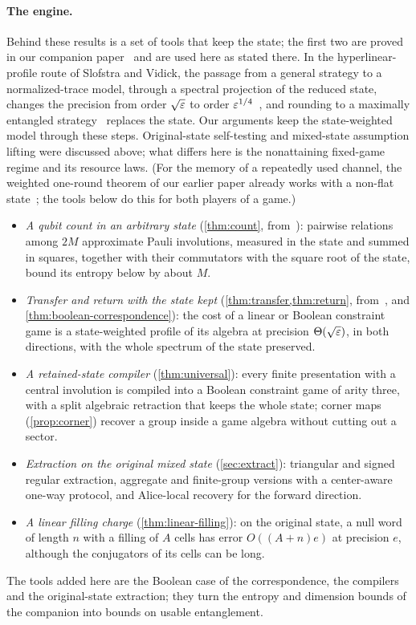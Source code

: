 \paragraph{The engine.} Behind these results is a set of tools that keep the state; the first two are proved in our companion
paper~\cite{DM-game} and are used here as stated there. In the hyperlinear-profile route of
Slofstra and Vidick, the passage from a general strategy to a normalized-trace model, through a spectral projection of the
reduced state, changes the precision from order $\sqrt{\varepsilon}$ to order $\varepsilon^{1/4}$~\cite[Theorem~5.1 and Lemmas~5.5,
5.6]{SV18}, and rounding to a maximally entangled strategy~\cite{Pad22} replaces the state. Our arguments keep the
state-weighted model through these steps. Original-state self-testing and mixed-state assumption lifting were discussed
above; what differs here is the nonattaining fixed-game regime and its resource laws. (For the memory of a repeatedly used
channel, the weighted one-round theorem of our earlier paper already works with a non-flat state~\cite[Theorem~10.1]{DM-lamps};
the tools below do this for both players of a game.)
\begin{itemize}[leftmargin=*,itemsep=2pt]
\item \emph{A qubit count in an arbitrary state} (\cref{thm:count}, from~\cite[Theorem~C]{DM-game}): pairwise relations among $2M$
approximate Pauli involutions, measured in the state and summed in squares, together with their commutators with the square root
of the state, bound its entropy below by about $M$.
\item \emph{Transfer and return with the state kept} (\cref{thm:transfer,thm:return}, from~\cite[Theorem~D]{DM-game}, and
\cref{thm:boolean-correspondence}): the cost of a linear or Boolean constraint game is a state-weighted profile of its algebra at
precision $\Theta(\sqrt{\varepsilon})$, in both directions, with the whole spectrum of the state preserved.
\item \emph{A retained-state compiler} (\cref{thm:universal}): every finite presentation with a central involution is compiled into
a Boolean constraint game of arity three, with a split algebraic retraction that keeps the whole state; corner maps
(\cref{prop:corner}) recover a group inside a game algebra without cutting out a sector.
\item \emph{Extraction on the original mixed state} (\cref{sec:extract}): triangular and signed regular extraction, aggregate and
finite-group versions with a center-aware one-way protocol, and Alice-local recovery for the forward direction.
\item \emph{A linear filling charge} (\cref{thm:linear-filling}): on the original state, a null word of length $n$ with a filling
of $A$ cells has error $O((A+n)e)$ at precision $e$, although the conjugators of its cells can be long.
\end{itemize}
The tools added here are the Boolean case of the correspondence, the compilers and the original-state extraction; they turn the
entropy and dimension bounds of the companion into bounds on usable entanglement.

